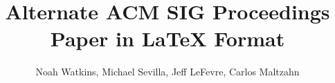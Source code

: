 \documentclass{sig-alternate-05-2015}
\begin{document}

\toappear{}




%

\title{Alternate {\ttlit ACM} SIG Proceedings Paper in LaTeX Format}
%
%
%
%
%

%
\author{
%
%
\alignauthor
Noah Watkins, Michael Sevilla, Jeff LeFevre, Carlos Maltzahn
}
\end{document}
